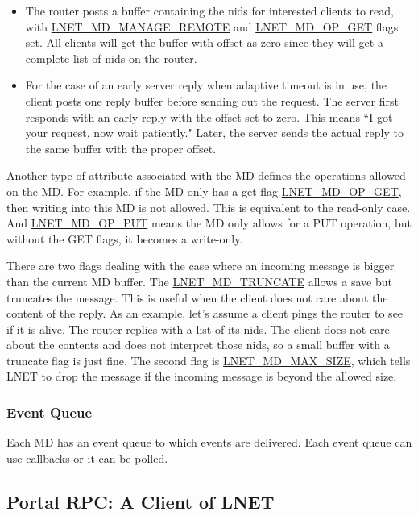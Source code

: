 \begin{itemize}

\item The router posts a buffer containing the nids for interested clients to read,
with \url{LNET_MD_MANAGE_REMOTE} and \url{LNET_MD_OP_GET} flags set. All clients
will get the buffer with offset as zero since they will get a complete list of nids
on the router.

\item For the case of an early server reply when adaptive timeout is in use,
the client posts one reply buffer before sending out the request. The server first
responds with an early reply with the offset set to zero. This means ``I got your
request, now wait patiently." Later, the server sends the actual reply to the
same buffer with the proper offset.  

\end{itemize}

Another type of attribute associated with the MD defines the operations
allowed on the MD. For example, if the MD only has a get flag
\url{LNET_MD_OP_GET}, then writing into this MD is not allowed. This is
equivalent to the read-only case. And \url{LNET_MD_OP_PUT} means the MD only
allows for a PUT operation, but without the GET flags, it becomes a write-only. 

There are two flags dealing with the case where an incoming message is bigger
than the current MD buffer. The \url{LNET_MD_TRUNCATE} allows a save but
truncates the message. This is useful when the client does not care about the
content of the reply. As an example, let's assume a client pings the router to
see if it is alive. The router replies with a list of its nids. The client does
not care about the contents and does not interpret those nids, so a small
buffer with a truncate flag is just fine.  The second flag is
\url{LNET_MD_MAX_SIZE}, which tells LNET to drop the message if the incoming
message is beyond the allowed size.

\subsubsection*{Event Queue}

Each MD has an event queue to which events are delivered. Each event queue can use 
callbacks or it can be polled.

\subsection{Portal RPC: A Client of LNET}

